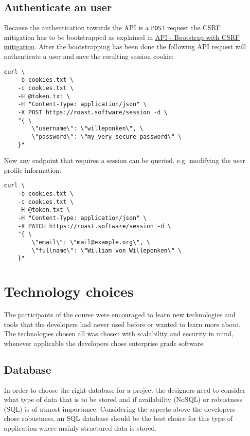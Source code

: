 \documentclass[12pt,a4paper]{report}
\begin{document}
\section{Authenticate an user}
Because the authentication towards the API is a \texttt{POST} request the CSRF mitigation has to be bootstrapped as explained in \hyperref[sec:api-bootstrap]{API - Bootstrap with CSRF mitigation}. After the bootstrapping has been done the following API request will authenticate a user and save the resulting session cookie:
\begin{verbatim}
curl \
    -b cookies.txt \
    -c cookies.txt \
    -H @token.txt \
    -H "Content-Type: application/json" \
    -X POST https://roast.software/session -d \
    "{ \
        \"username\": \"willeponken\", \
        \"password\": \"my_very_secure_password\" \
    }"
\end{verbatim}

Now any endpoint that requires a session can be queried, e.g. modifying the user profile information:
\begin{verbatim}
curl \
    -b cookies.txt \
    -c cookies.txt \
    -H @token.txt \
    -H "Content-Type: application/json" \
    -X PATCH https://roast.software/session -d \
    "{ \
        \"email\": \"mail@example.org\", \
        \"fullname\": \"William von Willeponken\" \
    }"
\end{verbatim}

\chapter{Technology choices}
The participants of the course were encouraged to learn new technologies and tools that the developers had never used before or wanted to learn more about. The technologies chosen all was chosen with scalability and security in mind, whenever applicable the developers chose enterprise grade software.
\section{Database}
In order to choose the right database for a project the designers need to consider what type of data that is to be stored and if availability (NoSQL) or robustness (SQL) is of utmost importance.
Considering the aspects above the developers chose robustness, an SQL database should be the best choice for this type of application where mainly structured data is stored. 
\end{document}
